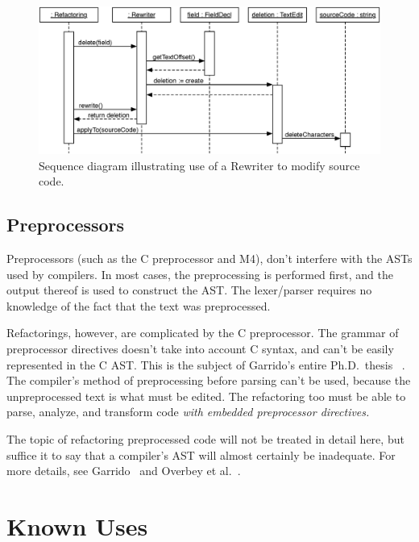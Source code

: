 \documentclass[prodmode]{acmlarge}
\begin{document}
\begin{itemize}
\begin{figure}[!bt]
\begin{center}
\includegraphics[width=.9\textwidth]{seq-diagram.eps}
\end{center}
\caption{Sequence diagram illustrating use of a Rewriter to modify source code.}
\label{fig:seq-diagram}
\end{figure}

\end{itemize}

\subsection{Preprocessors}
Preprocessors (such as the C preprocessor and M4), don't interfere with the ASTs
used by compilers. In most cases, the preprocessing is performed first, and the
output thereof is used to construct the AST. The lexer/parser requires no 
knowledge of the fact that the text was preprocessed.

Refactorings, however, are complicated by the C preprocessor. The grammar of 
preprocessor directives doesn't take into account C syntax, and can't be easily
represented in the C AST. This is the subject of Garrido's entire Ph.D.~thesis~%
\cite{garrido05program}. The compiler's method of preprocessing before parsing
can't be used, because the unpreprocessed text is what must be edited. The 
refactoring too must be able to parse, analyze, and transform code \textit{
with embedded preprocessor directives.}

The topic of refactoring preprocessed code will not be treated in detail here,
but suffice it to say that a compiler's AST will almost certainly be inadequate.
For more details, see Garrido~\cite{garrido2013} and Overbey et al.~\cite{wrt2009}.

\section{Known Uses}
\end{document}
